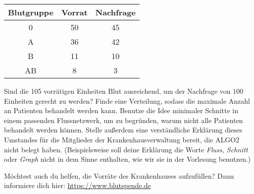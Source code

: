 \documentclass{uebung_cs}
\begin{document}
\begin{aufgabe}[Blutspende]
\begin{enumerate}
    	\vspace{4mm}
    	\begin{center}
    	\begin{tabular}{|c|c|c|}
    	\hline 
    	Blutgruppe & Vorrat & Nachfrage \\ 
    	\hline 
    	0 & 50 & 45 \\ 
    	\hline 
    	A & 36 & 42 \\ 
    	\hline 
    	B & 11 & 10 \\ 
    	\hline 
    	AB & 8 & 3 \\ 
    	\hline 
    	\end{tabular}
    	\end{center}
    	\vspace{4mm}
    	Sind die 105 vorrätigen Einheiten Blut ausreichend, um der Nachfrage von $100$ Einheiten gerecht zu werden? Finde eine Verteilung, sodass die maximale Anzahl an Patienten behandelt werden kann. Benutze die Idee minimaler Schnitte in einem passenden Flussnetzwerk, um zu begründen, warum nicht alle Patienten behandelt werden können. Stelle außerdem eine verständliche Erklärung dieses Umstandes für die Mitglieder der Krankenhausverwaltung bereit, die ALGO2 nicht belegt haben. (Beispielsweise soll deine Erklärung die Worte \textit{Fluss, Schnitt} oder \textit{Graph} nicht in dem Sinne enthalten, wie wir sie in der Vorlesung benutzen.)
    \end{enumerate}
    \vspace{4mm}
    Möchtest auch du helfen, die Vorräte des Krankenhauses aufzufüllen? Dann informiere dich hier: \url{https://www.blutspende.de}
\end{aufgabe}
\end{document}
